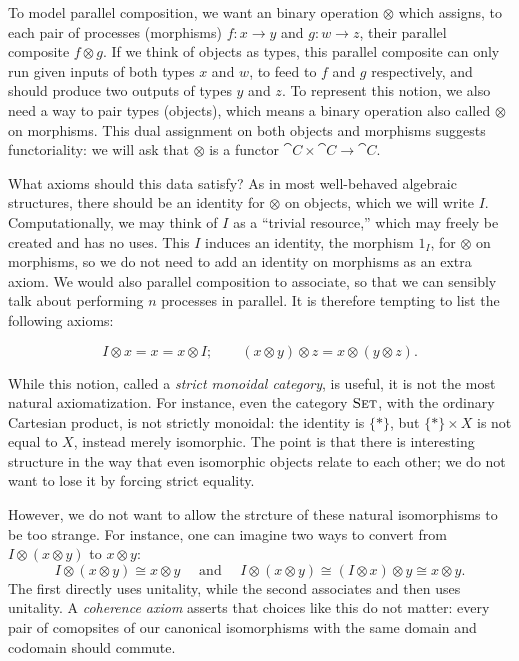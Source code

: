 To model parallel composition, we want an binary operation $\otimes$ which
assigns, to each pair of processes (morphisms) $f:x\to y$ and $g:w\to z$, their
parallel composite $f\otimes g$. If we think of objects as types, this parallel
composite can only run given inputs of both types $x$ and $w$, to feed to $f$
and $g$ respectively, and should produce two outputs of types $y$ and $z$. To
represent this notion, we also need a way to pair types (objects), which means a
binary operation also called $\otimes$ on morphisms. This dual assignment on
both objects and morphisms suggests functoriality: we will ask that $\otimes$ is
a functor $\cat{C}\times\cat{C}\to\cat{C}$.

What axioms should this data satisfy? As in most well-behaved algebraic
structures, there should be an identity for $\otimes$ on objects, which we will
write $I$. Computationally, we may think of $I$ as a ``trivial resource,'' which
may freely be created and has no uses. This $I$ induces an identity, the
morphism $1_I$, for $\otimes$ on morphisms, so we do not need to add an identity
on morphisms as an extra axiom. We would also parallel composition to associate,
so that we can sensibly talk about performing $n$ processes in parallel. It is
therefore tempting to list the following axioms:

\[
  I\otimes x = x = x\otimes I; \quad\quad (x\otimes y)\otimes z =
  x\otimes(y\otimes z).
\]

While this notion, called a \emph{strict monoidal category}, is useful, it is
not the most natural axiomatization. For instance, even the category
${\textsc{\text{Set}}}$, with the ordinary Cartesian product, is not strictly monoidal: the
identity is $\{*\}$, but $\{*\}\times X$ is not equal to $X$, instead merely
isomorphic. The point is that there is interesting structure in the way that
even isomorphic objects relate to each other; we do not want to lose it by
forcing strict equality.

However, we do not want to allow the strcture of these natural isomorphisms to
be too strange. For instance, one can imagine two ways to convert from $I\otimes (x\otimes y)$
to $x\otimes y$: \[
  I\otimes(x\otimes y) \cong x\otimes y \quad\text{ and }\quad
  I\otimes(x\otimes y) \cong (I\otimes x)\otimes y \cong x\otimes y.
\]The first directly uses unitality, while the second associates and then uses
unitality. A \emph{coherence axiom} asserts that choices like this do not
matter: every pair of comopsites of our canonical isomorphisms with the same
domain and codomain should commute.

